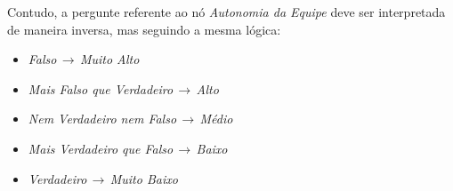 Contudo, a pergunte referente ao nó \textit{Autonomia da Equipe} deve ser interpretada de maneira inversa, mas seguindo a mesma lógica:

\begin{itemize}
  \item \textit{Falso}$\,\to\,$\textit{Muito Alto}
  \item \textit{Mais Falso que Verdadeiro}$\,\to\,$\textit{Alto}
  \item \textit{Nem Verdadeiro nem Falso}$\,\to\,$\textit{Médio}
  \item \textit{Mais Verdadeiro que Falso}$\,\to\,$\textit{Baixo}
  \item \textit{Verdadeiro}$\,\to\,$\textit{Muito Baixo}
\end{itemize}



